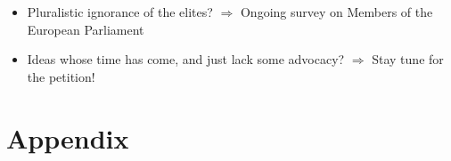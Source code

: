 \begin{framefont}{\small}
\begin{frame}{}
\begin{itemize}
\begin{itemize}
        \item Pluralistic ignorance of the elites? $\Rightarrow$ Ongoing survey on Members of the European Parliament 
        \item Ideas whose time has come, and just lack some advocacy? $\Rightarrow$ Stay tune for the petition! %
    \end{itemize}
\end{itemize}
\end{frame}

\appendix
\section{Appendix}




\end{framefont}
